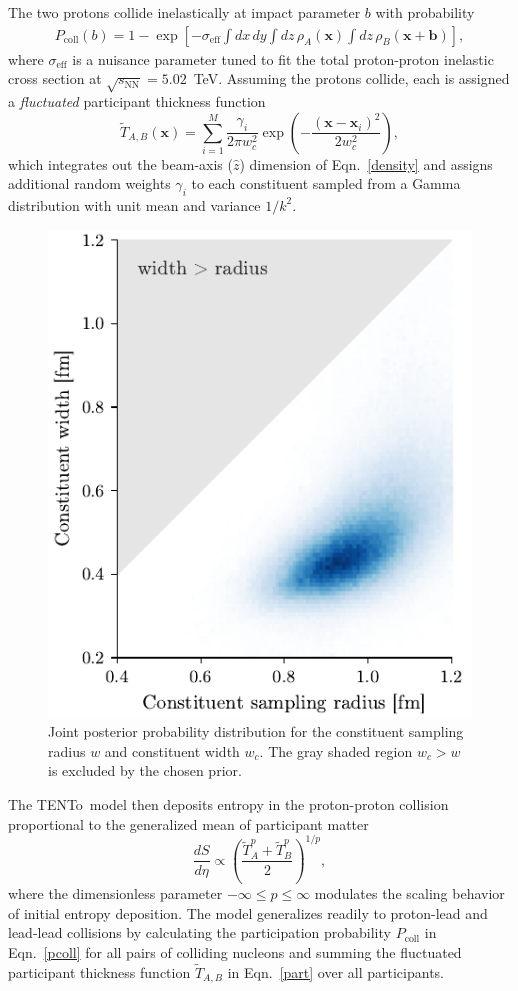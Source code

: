 \documentclass[3p,times,procedia]{elsarticle}
\newcommand{\trento}{T\raisebox{-0.3ex}{R}ENTo}
\newcommand{\sqrts}{\sqrt{s_\mathrm{NN}}}
\newcommand{\T}{\tilde{T}}
\begin{document}
The two protons collide inelastically at impact parameter $b$ with probability
\begin{align}
  \label{pcoll}
  P_\text{coll}(b) = 1 - \exp\left[-\sigma_\text{eff} \int dx\,dy \int dz\, \rho_A(\mathbf{x}) \int dz\, \rho_B(\mathbf{x} + \mathbf{b}) \right],
\end{align}
where $\sigma_\text{eff}$ is a nuisance parameter tuned to fit the total proton-proton inelastic cross section at \mbox{$\sqrts=5.02$~TeV}.
Assuming the protons collide, each is assigned a \emph{fluctuated} participant thickness function
\begin{equation}
  \label{part}
  \T_{A,B}(\mathbf{x}) = \sum\limits_{i=1}^{M} \frac{\gamma_i}{2 \pi w_c^2} \exp\left(-\frac{(\textbf{x}-\textbf{x}_i)^2}{2 w_c^2}\right),
\end{equation}
which integrates out the beam-axis ($\hat{z}$) dimension of Eqn.~\eqref{density} and assigns additional random weights $\gamma_i$ to each constituent sampled from a Gamma distribution with unit mean and variance $1/k^2$.

\begin{figure}
  \includegraphics[width=.5\textwidth]{proton_posterior_shape}
  \caption{Joint posterior probability distribution for the constituent sampling radius $w$ and constituent width $w_c$. The gray shaded region $w_c > w$ is excluded by the chosen prior.}
\end{figure}

The \trento\ model then deposits entropy in the proton-proton collision proportional to the generalized mean of participant matter
\begin{equation}
  \label{gmean}
  \frac{dS}{d\eta} \propto \left(\frac{\T_A^p + \T_B^p}{2} \right)^{1/p},
\end{equation}
where the dimensionless parameter $-\infty \le p \le \infty$ modulates the scaling behavior of initial entropy deposition.
The model generalizes readily to proton-lead and lead-lead collisions by calculating the participation probability $P_\text{coll}$ in Eqn.~\eqref{pcoll} for all pairs of colliding nucleons and summing the fluctuated participant thickness function $\T_{A,B}$ in Eqn.~\eqref{part} over all participants.
\end{document}
